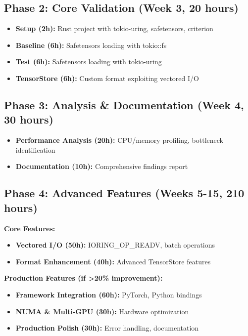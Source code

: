 \documentclass{article}
\begin{document}
\subsection{Phase 2: Core Validation (Week 3, 20 hours)}

\begin{itemize}
\item \textbf{Setup (2h):} Rust project with tokio-uring, safetensors, criterion
\item \textbf{Baseline (6h):} Safetensors loading with tokio::fs
\item \textbf{Test (6h):} Safetensors loading with tokio-uring
\item \textbf{TensorStore (6h):} Custom format exploiting vectored I/O
\end{itemize}

\subsection{Phase 3: Analysis \& Documentation (Week 4, 30 hours)}

\begin{itemize}
\item \textbf{Performance Analysis (20h):} CPU/memory profiling, bottleneck identification
\item \textbf{Documentation (10h):} Comprehensive findings report
\end{itemize}

\subsection{Phase 4: Advanced Features (Weeks 5-15, 210 hours)}

\textbf{Core Features:}
\begin{itemize}
\item \textbf{Vectored I/O (50h):} IORING\_OP\_READV, batch operations
\item \textbf{Format Enhancement (40h):} Advanced TensorStore features
\end{itemize}

\textbf{Production Features (if >20\% improvement):}
\begin{itemize}
\item \textbf{Framework Integration (60h):} PyTorch, Python bindings
\item \textbf{NUMA \& Multi-GPU (30h):} Hardware optimization
\item \textbf{Production Polish (30h):} Error handling, documentation
\end{itemize}
\end{document}

